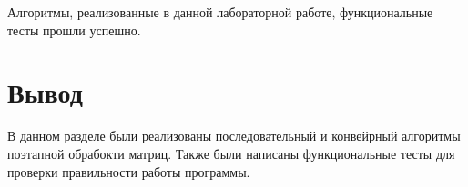 Алгоритмы, реализованные в данной лабораторной работе, функциональные тесты прошли успешно.

\clearpage
\section*{Вывод}

В данном разделе были реализованы последовательный и конвейрный алгоритмы
поэтапной обрабокти матриц. Также были написаны функциональные тесты для проверки
правильности работы программы.
